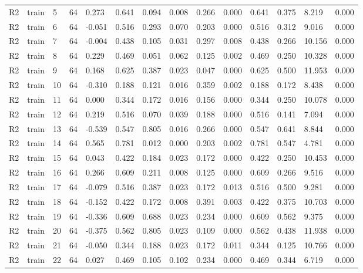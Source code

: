 \begin{table}[t]
\begin{tabular}{llllllllllllll}
R2 & train & 5 & 64 & 0.273 & 0.641 & 0.094 & 0.008 & 0.266 & 0.000 & 0.641 & 0.375 & 8.219 & 0.000 \\
R2 & train & 6 & 64 & -0.051 & 0.516 & 0.293 & 0.070 & 0.203 & 0.000 & 0.516 & 0.312 & 9.016 & 0.000 \\
R2 & train & 7 & 64 & -0.004 & 0.438 & 0.105 & 0.031 & 0.297 & 0.008 & 0.438 & 0.266 & 10.156 & 0.000 \\
R2 & train & 8 & 64 & 0.229 & 0.469 & 0.051 & 0.062 & 0.125 & 0.002 & 0.469 & 0.250 & 10.328 & 0.000 \\
R2 & train & 9 & 64 & 0.168 & 0.625 & 0.387 & 0.023 & 0.047 & 0.000 & 0.625 & 0.500 & 11.953 & 0.000 \\
R2 & train & 10 & 64 & -0.310 & 0.188 & 0.121 & 0.016 & 0.359 & 0.002 & 0.188 & 0.172 & 8.438 & 0.000 \\
R2 & train & 11 & 64 & 0.000 & 0.344 & 0.172 & 0.016 & 0.156 & 0.000 & 0.344 & 0.250 & 10.078 & 0.000 \\
R2 & train & 12 & 64 & 0.219 & 0.516 & 0.070 & 0.039 & 0.188 & 0.000 & 0.516 & 0.141 & 7.094 & 0.000 \\
R2 & train & 13 & 64 & -0.539 & 0.547 & 0.805 & 0.016 & 0.266 & 0.000 & 0.547 & 0.641 & 8.844 & 0.000 \\
R2 & train & 14 & 64 & 0.565 & 0.781 & 0.012 & 0.000 & 0.203 & 0.002 & 0.781 & 0.547 & 4.781 & 0.000 \\
R2 & train & 15 & 64 & 0.043 & 0.422 & 0.184 & 0.023 & 0.172 & 0.000 & 0.422 & 0.250 & 10.453 & 0.000 \\
R2 & train & 16 & 64 & 0.266 & 0.609 & 0.211 & 0.008 & 0.125 & 0.000 & 0.609 & 0.266 & 9.516 & 0.000 \\
R2 & train & 17 & 64 & -0.079 & 0.516 & 0.387 & 0.023 & 0.172 & 0.013 & 0.516 & 0.500 & 9.281 & 0.000 \\
R2 & train & 18 & 64 & -0.152 & 0.422 & 0.172 & 0.008 & 0.391 & 0.003 & 0.422 & 0.375 & 10.703 & 0.000 \\
R2 & train & 19 & 64 & -0.336 & 0.609 & 0.688 & 0.023 & 0.234 & 0.000 & 0.609 & 0.562 & 9.375 & 0.000 \\
R2 & train & 20 & 64 & -0.375 & 0.562 & 0.805 & 0.023 & 0.109 & 0.000 & 0.562 & 0.438 & 11.938 & 0.000 \\
R2 & train & 21 & 64 & -0.050 & 0.344 & 0.188 & 0.023 & 0.172 & 0.011 & 0.344 & 0.125 & 10.766 & 0.000 \\
R2 & train & 22 & 64 & 0.027 & 0.469 & 0.105 & 0.102 & 0.234 & 0.000 & 0.469 & 0.344 & 6.719 & 0.000 \\

\end{tabular}
\end{table}
